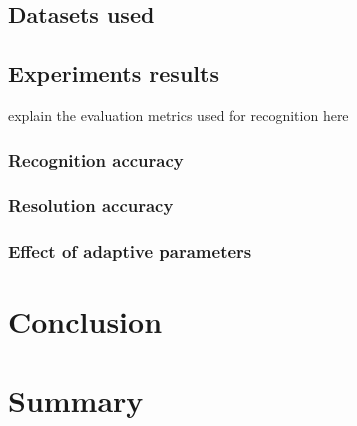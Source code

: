 \documentclass[
     11pt,         %
     a4paper,      %
     oneside,
     ]{article}
\begin{document}
\subsection{Datasets used}
\subsection{Experiments results}
explain the evaluation metrics used for recognition here
\subsubsection{Recognition accuracy}
\subsubsection{Resolution accuracy}
\subsubsection{Effect of adaptive parameters}
\section{Conclusion}\label{sec:conclusion}

\section{Summary}

\newpage
{}


\end{document}
